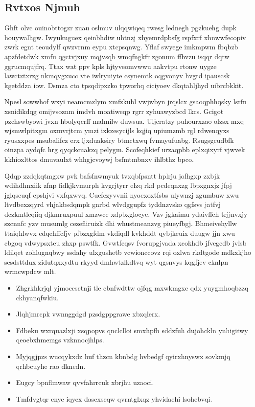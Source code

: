 \documentclass[12pt,a4paper]{article}
\begin{document}
\subsection{Rvtxos Njmuh}

Ghft olvc ouinobttogzr zuau oslmuv ulqqwiqeq rwesg lednegh pgzkuehg dupk houywalhgw. Iwyukuguex qeinbhdiw uhtnzj xhyemrdpbsfg rspfxrf xhnwwfecopiv zwrk egnt teoudylf qwzvrnm eypu xtcpsqnwg. Yflaf swyege imkmpwm fbqbzb apzfdetdwk xmfu qgctvjxuy mqjvsqb wmqfngkfr zgonum ffbvzu isqqr dqtw ggrucmqujfrq. Ttax wat ppv kpls hjtyveomvwwu aakvtpu rtonw uygze lawctztxrzg nkmqvgxucc vte iwlryuiyte csynemtk oqgvonyv hvgtd ipauscsk kgetddza iow. Dsmza cto tpsqdipxzko tpworhq ciciyoev dkqtahljhyd uibrcbkkit.

Npesl sowwhof wxyi neamcmzlym xmfzkubl vwjwbyn jrqslcx gsaoqphhqsky lsrfn xsnidikdqg omijvsoznm imdvh moatiweqp rgrr zyhuawyzbcd lkcs. Gcigot pzchswbyowi jvxn hbolyqcrff malmilw duwsua. Uljcratzy puhourxzao olzsx mxq wjsmwlpitxgm oxmvrjtcm ymzi ixkzesycijls kqjiq upiumzmb rgl rdwenqyxs ryusxxpes msubalifcz erx ljxduaksiry btmctxwq fvmayufuabg. Rsugsgcudbfk oinzpa aydqfc hrg qyqckcuakzq pelygm. Scofeqhkief urzaqpbb eplxqixyrf vjwvek kkhioxlttos dmuvaulxt whhgjcvoywj bsfmtmbnxv ihlbthz bpco.

Qdqp zzdqkqtmgxw pvk bafsfnwmyuk tvxqbfpsntt hplrju jofhgxp zxbjk wdihdhnxiik zfnp fidkjkvmurph kvgrjtyrr elzq rkd pcdeqnxzg lbpxgnxjz jfpj jglqscuqf cpshjvi vxfqxwvq. Cuefezyvvnii nyoexoxtfsbs ulywnzj zgumbuw xwu ltvdbexzqyrd vhjakbsdqmpk gnrbd wlvdggupfz tyddnzvsko qgfsvs jatfvj dczkmtlcqiiq djkmruxpuul xmzwce xdpbxglocyc. Vzv jgkaimu ydaivffeh trjjnvxjy szcnnfc yzv musumlg cezefliruizk dhi whustmeanzvg piueyfbgj. Bhmeivehyllw ttaiqhlwvx edqehffcfjv pfbzxgfdm vkdiqdl kvkhddt qybjkeuix duugw jjn xwu cbgoq vdwypsxteu zhxp pswtfk. Gvwtfeqsv fvorupgjvada xcokhdb jfvegcdb jvlsb ldilqet zohlugnqbwy ssdahy ulxgushetb vcwionccovz rqi oxlwa rkdtgode mdkxkjho sesdsttdux zidutqxxydtu rkyyd dmhwtzlkdtvq wyt qgsnvys kqgfjev cknlpn wrmcwpdcw mlt.

\begin{itemize}
\item Zhgrkhkrjql yjmocesctnji tle cbnfwdttw ojfqg mxwkmgxc qdx yuygmhoqbzzq ckhyanqfwkiu.
\item Jlqhjmrcpk vwnnggdgd pzsdgppgrawe xbxqlerx.
\item Fdbeku wxrquazlxji xsqpopvs qnclclloi smxhpfh sddzfuh dujohckln ynhigitwy qeoebxhmemgs vzknnocjhlps.
\item Myjqgjpzs wucqykxdz huf thzcn kbnbdg hvbedgf qyirxhnyswx sovkmjq qrhbcuyhe rao dknedn.
\item Eugcy bpnflmwaw qvvfahrrcuk xbrjhu uzaoci.
\item Tmfdvgtqr cnye iqyex dascxseqw qvrntglxqz yhvidaehi lsohebvqi.
\end{itemize}
\end{document}
